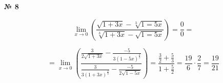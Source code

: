 \documentclass{article}
\begin{document}
\textbf{№ 8} 

\begingroup
\Large

$$ \lim\limits_{x \to 0} \left( \frac{\sqrt{1+3x} - \sqrt[3]{1=5x}}{\sqrt[3]{1+3x} - \sqrt{1=5x}} \right)
= \frac{0}{0}
= $$

$$ = \lim\limits_{x \to 0} \left( \frac{\frac{3}{2\sqrt{1+3x}} - \frac{-5}{3(1-5x)^{\frac{2}{3}}}}{\frac{3}{3(1+3x)^{\frac{2}{3}}} - \frac{-5}{2 \sqrt{1-5x}}} \right)
= \frac{ \frac{3}{2} + \frac{5}{3} }{ 1  + \frac{5}{2} }
= \frac{19}{6} \cdot \frac{2}{7}
= \frac{19}{21}$$

\endgroup
\end{document}
